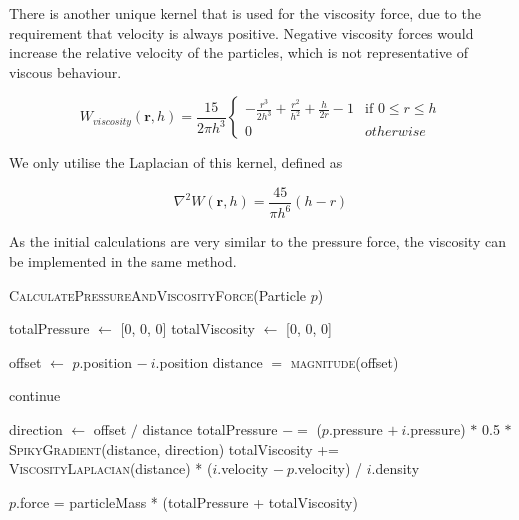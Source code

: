 \documentclass[12pt]{article}
\begin{document}
    There is another unique kernel that is used for the viscosity force, due to the requirement that velocity is always positive. Negative viscosity forces would increase the relative velocity of the particles, which is not representative of viscous behaviour.

    \begin{equation}
        W_{viscosity}(\textbf{r}, h) = \frac{15}{2\pi{h}^3}
        \begin{cases}
            -\frac{r^3}{2h^3}+\frac{r^2}{h^2}+\frac{h}{2r} - 1 & \text{if } 0 \leq r \leq h \\
            0 & otherwise
        \end{cases}
    \end{equation}

    We only utilise the Laplacian of this kernel, defined as

    \begin{equation}
        \nabla^2W(\textbf{r}, h) = \frac{45}{\pi{h}^6}(h - r)
    \end{equation}

    As the initial calculations are very similar to the pressure force, the viscosity can be implemented in the same method.

    \begin{algorithm}[H]
        \caption{\textsc{CalculatePressureAndViscosityForce}(Particle $p$)}

        \begin{algorithmic}
            \State totalPressure $\gets$ [0, 0, 0]
            \State totalViscosity $\gets$ [0, 0, 0]

                \State offset $\gets$ $p$.position $-\ i$.position
                \State distance $=$ \textsc{magnitude}(offset)

                    continue
                \EndIf

                \State direction $\gets$ offset $/$ distance
                \State totalPressure $-=$ ($p$.pressure $+\ i$.pressure) $*$ 0.5 $*$ \textsc{SpikyGradient}(distance, direction)
                \State totalViscosity += \textsc{ViscosityLaplacian}(distance) *
                \Statex \hspace{\algorithmicindent} ($i$.velocity $-\ p$.velocity) / $i$.density
            \EndFor
            
            $p$.force = particleMass * (totalPressure + totalViscosity)
        \end{algorithmic}

    \end{algorithm}
\end{document}
